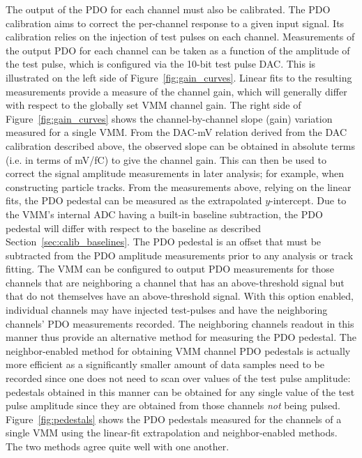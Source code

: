 The output of the PDO for each channel must also be calibrated.
The PDO calibration aims to correct the per-channel response to a given input
signal.
Its calibration relies on the injection of test pulses on each channel.
Measurements of the output PDO for each channel can be taken as a function
of the amplitude of the test pulse, which is configured via the 10-bit test pulse DAC.
This is illustrated on the left side of Figure~\ref{fig:gain_curves}.
Linear fits to the resulting measurements provide a measure of the channel gain, which
will generally differ with respect to the globally set VMM channel gain.
The right side of Figure~\ref{fig:gain_curves} shows the channel-by-channel slope (gain)
variation measured for a single VMM.
From the DAC-mV relation derived from the DAC calibration described above, the
observed slope can be obtained in absolute terms (i.e. in terms of mV/fC) to give the channel gain.
This can then be used
to correct the signal amplitude measurements in later analysis; for example, when constructing particle tracks.
From the measurements above, relying on the linear fits, the PDO pedestal can be measured
as the extrapolated $y$-intercept.
Due to the VMM's internal ADC having a built-in baseline subtraction, the PDO pedestal will
differ with respect to the baseline as described Section~\ref{sec:calib_baselines}.
The PDO pedestal is an offset that must be subtracted from the PDO amplitude measurements
prior to any analysis or track fitting.
The VMM can be configured to output PDO measurements for those channels that are neighboring
a channel that has an above-threshold signal but that do not themselves have an above-threshold
signal.
With this option enabled, individual channels may have injected test-pulses and have the  neighboring
channels' PDO measurements recorded.
The neighboring channels readout in this manner thus provide
an alternative method for measuring the PDO pedestal.
The neighbor-enabled method for obtaining VMM channel PDO pedestals is actually more efficient
as a significantly smaller amount of data samples need to be recorded since one does not
need to scan over values of the test pulse amplitude: pedestals obtained in this manner
can be obtained for any single value of the test pulse amplitude since they are obtained from those channels
\textit{not} being pulsed.
Figure~\ref{fig:pedestals} shows the PDO pedestals measured for the channels of a single VMM
using the linear-fit extrapolation and neighbor-enabled methods.
The two methods agree quite well with one another.

